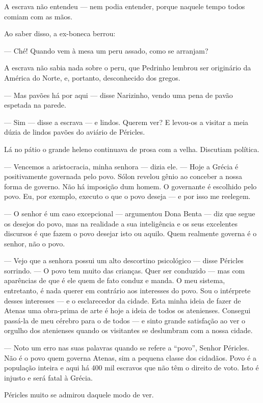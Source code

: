 A escrava não entendeu --- nem podia entender, porque naquele tempo
todos comiam com as mãos.

Ao saber disso, a ex-boneca berrou:

--- Ché! Quando vem à mesa um peru assado, como se arranjam?

A escrava não sabia nada sobre o peru, que Pedrinho lembrou ser
originário da América do Norte, e, portanto, desconhecido dos gregos.

--- Mas pavões há por aqui --- disse Narizinho, vendo uma pena de pavão
espetada na parede.

--- Sim --- disse a escrava --- e lindos. Querem ver? E levou-os a
visitar a meia dúzia de lindos pavões do aviário de Péricles.

Lá no pátio o grande heleno continuava de prosa com a velha. Discutiam
política.

--- Vencemos a aristocracia, minha senhora --- dizia ele. --- Hoje a
Grécia é positivamente governada pelo povo. Sólon revelou gênio ao
conceber a nossa forma de governo. Não há imposição dum homem. O
governante é escolhido pelo povo. Eu, por exemplo, executo o que o povo
deseja --- e por isso me reelegem.

--- O senhor é um caso excepcional --- argumentou Dona Benta --- diz que
segue os desejos do povo, mas na realidade a sua inteligência e os seus
excelentes discursos é que fazem o povo desejar isto ou aquilo. Quem
realmente governa é o senhor, não o povo.

--- Vejo que a senhora possui um alto descortino psicológico --- disse
Péricles sorrindo. --- O povo tem muito das crianças. Quer ser conduzido
--- mas com aparências de que é ele quem de fato conduz e manda. O meu
sistema, entretanto, é nada querer em contrário aos interesses do povo.
Sou o intérprete desses interesses --- e o esclarecedor da cidade. Esta
minha ideia de fazer de Atenas uma obra-prima de arte é hoje a ideia de
todos os atenienses. Consegui passá-la de meu cérebro para o de todos
--- e sinto grande satisfação ao ver o orgulho dos atenienses quando os
visitantes se deslumbram com a nossa cidade.

--- Noto um erro nas suas palavras quando se refere a ``povo'', Senhor
Péricles. Não é o povo quem governa Atenas, sim a pequena classe dos
cidadãos. Povo é a população inteira e aqui há 400 mil escravos que não
têm o direito de voto. Isto é injusto e será fatal à Grécia.

Péricles muito se admirou daquele modo de ver.

